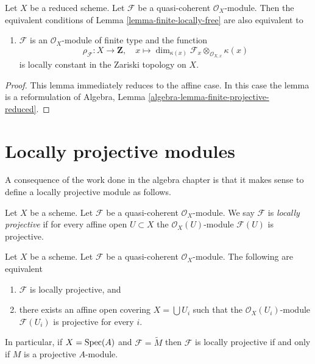 \begin{lemma}
\label{lemma-finite-locally-free-reduced}
Let $X$ be a reduced scheme. Let $\mathcal{F}$ be a quasi-coherent
$\mathcal{O}_X$-module. Then the equivalent conditions of
Lemma \ref{lemma-finite-locally-free} are also equivalent to
\begin{enumerate}
\item[(6)] $\mathcal{F}$ is an $\mathcal{O}_X$-module of finite type and
the function
$$
\rho_\mathcal{F} : X \to \mathbf{Z}, \quad
x \longmapsto
\dim_{\kappa(x)} \mathcal{F}_x \otimes_{\mathcal{O}_{X, x}} \kappa(x)
$$
is locally constant in the Zariski topology on $X$.
\end{enumerate}
\end{lemma}

\begin{proof}
This lemma immediately reduces to the affine case.
In this case the lemma is a reformulation of
Algebra, Lemma \ref{algebra-lemma-finite-projective-reduced}.
\end{proof}




\section{Locally projective modules}
\label{section-locally-projective}

\noindent
A consequence of the work done in the algebra chapter is that it
makes sense to define a locally projective module as follows.

\begin{definition}
\label{definition-locally-projective}
Let $X$ be a scheme. Let $\mathcal{F}$ be a quasi-coherent
$\mathcal{O}_X$-module. We say $\mathcal{F}$ is {\it locally projective}
if for every affine open $U \subset X$ the $\mathcal{O}_X(U)$-module
$\mathcal{F}(U)$ is projective.
\end{definition}

\begin{lemma}
\label{lemma-locally-projective}
Let $X$ be a scheme.
Let $\mathcal{F}$ be a quasi-coherent $\mathcal{O}_X$-module.
The following are equivalent
\begin{enumerate}
\item $\mathcal{F}$ is locally projective, and
\item there exists an affine open covering $X = \bigcup U_i$
such that the $\mathcal{O}_X(U_i)$-module
$\mathcal{F}(U_i)$ is projective for every $i$.
\end{enumerate}
In particular, if $X = \mathop{\mathrm{Spec}}(A)$ and $\mathcal{F} = \widetilde{M}$
then $\mathcal{F}$ is locally projective if and only if $M$ is a projective
$A$-module.
\end{lemma}

